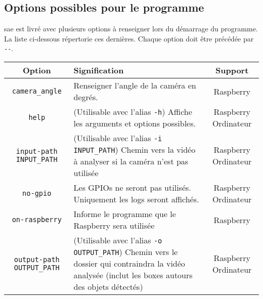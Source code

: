 \subsection{Options possibles pour le programme}
\label{sec:executionOption_clearWay}
\gls{sae} est livré avec plusieurs options à renseigner lors du démarrage du programme. La liste ci-dessous répertorie ces dernières.
Chaque option doit être précédée par \verb=--=.
\begin{table}[H]
    \centering
    \begin{tabularx}{\linewidth}{|c|X|c|}
        \hline
        \rowcolor{tableColorDark} Option      & Signification                                                                                                                                           & Support              \\
        \hline
        \verb=camera_angle=                          & Renseigner l'angle de la caméra en degrés.                                                                                                                        & Raspberry               \\\hline
        \verb=help=                                  & (Utilisable avec l'alias \verb=-h=) Affiche les arguments et options possibles.                                                                                   & Raspberry Ordinateur    \\\hline
        \verb=input-path INPUT_PATH=                 & (Utilisable avec l'alias \verb=-i INPUT_PATH=) Chemin vers la vidéo à analyser si la caméra n'est pas utilisée                                                    & Raspberry Ordinateur    \\\hline
        \verb=no-gpio=                               & Les GPIOs ne seront pas utilisés. Uniquement les logs seront affichés.                                                                                            & Raspberry Ordinateur    \\\hline
        \verb=on-raspberry=                          & Informe le programme que le Raspberry sera utilisée                                                                                                               & Raspberry               \\\hline
        \verb=output-path OUTPUT_PATH=               & (Utilisable avec l'alias \verb=-o OUTPUT_PATH=) Chemin vers le dossier qui contraindra la vidéo analysée (inclut les boxes autours des objets détectés)           & Raspberry Ordinateur    \\\hline

\end{tabularx}
\end{table}
